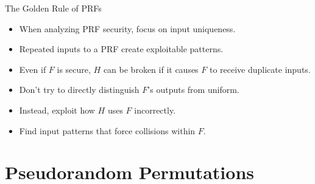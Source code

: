\documentclass[aspectratio=169, lualatex, handout]{beamer}
\begin{document}
\begin{frame}{The Golden Rule of PRFs}
	\begin{itemize}
		\item When analyzing PRF security, focus on input uniqueness.
		\item Repeated inputs to a PRF create exploitable patterns.
		\item Even if $F$ is secure, $H$ can be broken if it causes $F$ to receive duplicate inputs.
		\item Don't try to directly distinguish $F$'s outputs from uniform.
		\item Instead, exploit how $H$ uses $F$ incorrectly.
		\item Find input patterns that force collisions within $F$.
	\end{itemize}
\end{frame}

\section{Pseudorandom Permutations}
\end{document}
